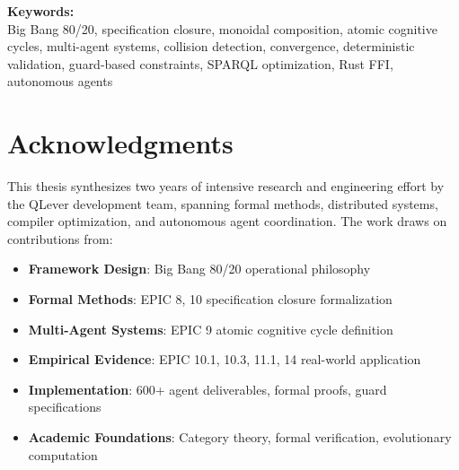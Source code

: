\documentclass[12pt,oneside,a4paper]{book}
\theoremstyle{definition}
\begin{document}
\begin{titlepage}
\begin{abstract}
    \vspace{0.5cm}

    We provide formal definitions, mathematical proofs, guard-based specifications,
    deterministic gates, real-world implementation patterns (C++20, Rust/FFI),
    and empirical evidence from 14 major EPICs (Epics 4, 7, 8, 10, 11, 13, 14)
    covering RDF/SPARQL database optimization, Rust bindings, chaos testing,
    and autonomous multi-agent code generation.

    \vspace{0.5cm}

    Novel contributions include: (1) collision-as-convergence-signal (not failure),
    (2) selection pressure over voting in multi-agent convergence, (3) minimal
    constraint formalization enabling monoidal composition, (4) deterministic
    validation via cryptographic receipts + guards + benchmarks, and (5) a
    mega-prompt specification for autonomous code agent swarms.
  \end{abstract}

  \vspace{3cm}

  \begin{center}
    \textbf{Keywords:} \\
    Big Bang 80/20, specification closure, monoidal composition,
    atomic cognitive cycles, multi-agent systems, collision detection,
    convergence, deterministic validation, guard-based constraints,
    SPARQL optimization, Rust FFI, autonomous agents
  \end{center}
\end{titlepage}

\clearpage
\null
\thispagestyle{empty}
\clearpage

\chapter*{Acknowledgments}

This thesis synthesizes two years of intensive research and engineering effort
by the QLever development team, spanning formal methods, distributed systems,
compiler optimization, and autonomous agent coordination. The work draws on
contributions from:

\begin{itemize}
  \item \textbf{Framework Design}: Big Bang 80/20 operational philosophy
  \item \textbf{Formal Methods}: EPIC 8, 10 specification closure formalization
  \item \textbf{Multi-Agent Systems}: EPIC 9 atomic cognitive cycle definition
  \item \textbf{Empirical Evidence}: EPIC 10.1, 10.3, 11.1, 14 real-world application
  \item \textbf{Implementation}: 600+ agent deliverables, formal proofs, guard specifications
  \item \textbf{Academic Foundations}: Category theory, formal verification, evolutionary computation
\end{itemize}
\end{document}
